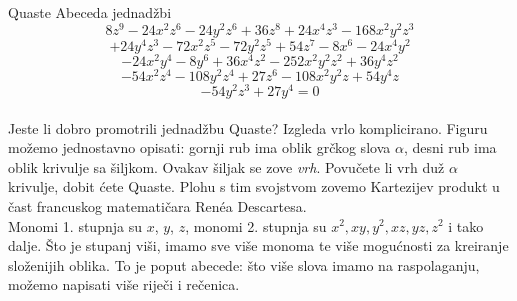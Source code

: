 \begin{surferPage}{Quaste}
Abeceda jednad\v{z}bi
  \smallskip
\[8z^9-24x^2z^6-24y^2z^6+36z^8+24x^4z^3-168x^2y^2z^3\]
\[+24y^4z^3-72x^2z^5-72y^2z^5+54z^7-8x^6-24x^4y^2\]
\[-24x^2y^4-8y^6 + 36x^4z^2-252x^2y^2z^2+36y^4z^2\]
\[- 54x^2z^4-108y^2z^4 + 27z^6-108x^2y^2z + 54y^4z\]
\[-54y^2z^3 + 27y^4 = 0\]\\
\vspace{0.3cm}
Jeste li dobro promotrili jednad\v{z}bu Quaste? Izgleda vrlo komplicirano.
Figuru mo\v{z}emo jednostavno opisati: gornji rub ima oblik gr\v{c}kog slova $\alpha$, desni rub ima oblik krivulje sa \v{s}iljkom. Ovakav \v{s}iljak se zove {\it vrh}. Povu\v{c}ete li vrh du\v{z} $\alpha$ krivulje, dobit \'{c}ete Quaste. Plohu s tim svojstvom zovemo Kartezijev produkt u \v{c}ast francuskog matemati\v{c}ara Ren\'ea Descartesa.  \\
\vspace{0.3cm}
Monomi 1. stupnja su $x$, $y$, $z$, monomi 2. stupnja su $x^2, xy, y^2, xz, yz, z^2$ i tako dalje. \v{S}to je stupanj vi\v{s}i, imamo sve vi\v{s}e monoma te vi\v{s}e mogu\'{c}nosti za kreiranje slo\v{z}enijih oblika. To je poput abecede: \v{s}to vi\v{s}e slova imamo na raspolaganju, mo\v{z}emo napisati vi\v{s}e rije\v{c}i i re\v{c}enica. 
\end{surferPage}
